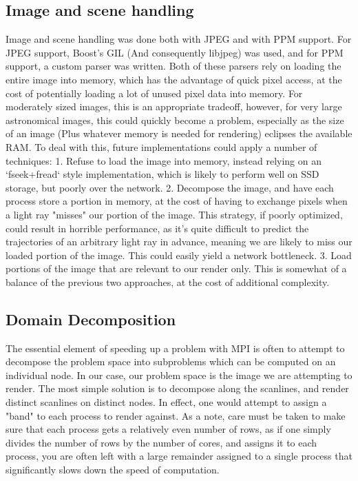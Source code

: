 \subsection {Image and scene handling}
Image and scene handling was done both with JPEG and with PPM support. For JPEG support, Boost's GIL (And consequently libjpeg) was used, and for PPM support, a custom parser was written. Both of these parsers rely on loading the entire image into memory, which has the advantage of quick pixel access, at the cost of potentially loading a lot of unused pixel data into memory. For moderately sized images, this is an appropriate tradeoff, however, for very large astronomical images, this could quickly become a problem, especially as the size of an image (Plus whatever memory is needed for rendering) eclipses the available RAM. To deal with this, future implementations could apply a number of techniques:
1. Refuse to load the image into memory, instead relying on an `fseek+fread` style implementation, which is likely to perform well on SSD storage, but poorly over the network.
2. Decompose the image, and have each process store a portion in memory, at the cost of having to exchange pixels when a light ray "misses" our portion of the image. This strategy, if poorly optimized, could result in horrible performance, as it's quite difficult to predict the trajectories of an arbitrary light ray in advance, meaning we are likely to miss our loaded portion of the image. This could easily yield a network bottleneck.
3. Load portions of the image that are relevant to our render only. This is somewhat of a balance of the previous two approaches, at the cost of additional complexity. 
\subsection {Domain Decomposition}

The essential element of speeding up a problem with MPI is often to attempt to decompose the problem space into subproblems which can be computed on an individual node. In our case, our problem space is the image we are attempting to render. The most simple solution is to decompose along the scanlines, and render distinct scanlines on distinct nodes. In effect, one would attempt to assign a "band" to each process to render against. As a note, care must be taken to make sure that each process gets a relatively even number of rows, as if one simply divides the number of rows by the number of cores, and assigns it to each process, you are often left with a large remainder assigned to a single process that significantly slows down the speed of computation.

